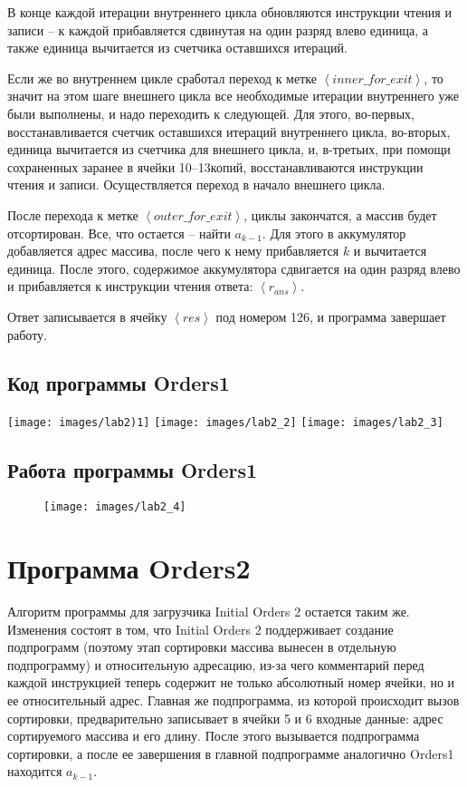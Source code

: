     В конце каждой итерации внутреннего цикла обновляются инструкции чтения и записи -- к каждой прибавляется сдвинутая на один разряд влево единица, а также единица вычитается из счетчика оставшихся итераций.

    Если же во внутреннем цикле сработал переход к метке $\left<inner\_for\_exit\right>$, то значит на этом шаге внешнего цикла все необходимые итерации внутреннего уже были выполнены, и надо переходить к следующей.
    Для этого, во-первых, восстанавливается счетчик оставшихся итераций внутреннего цикла, во-вторых, единица вычитается из счетчика для внешнего цикла, и, в-третьих, при помощи сохраненных заранее в ячейки 10--13копий, восстанавливаются инструкции чтения и записи.
    Осуществляется переход в начало внешнего цикла.

    После перехода к метке $\left<outer\_for\_exit\right>$, циклы закончатся, а массив будет отсортирован.
    Все, что остается -- найти $a_{k-1}$.
    Для этого в аккумулятор добавляется адрес массива, после чего к нему прибавляется $k$ и вычитается единица.
    После этого, содержимое аккумулятора сдвигается на один разряд влево и прибавляется к инструкции чтения ответа: $\left<r_{ans}\right>$.

    Ответ записывается в ячейку $\left<res\right>$ под номером 126, и программа завершает работу.

    \subsection{Код программы Orders1}
    \begin{flushleft}
        \texttt{[image: images/lab2)1]}
        \newpage
        \texttt{[image: images/lab2\_2]}
        \texttt{[image: images/lab2\_3]}
    \end{flushleft}
    \subsection{Работа программы Orders1}
    \begin{figure}[H]
        \centering
        \texttt{[image: images/lab2\_4]}
        \label{fig:res_1}
    \end{figure}

    \section{Программа Orders2}
    Алгоритм программы для загрузчика Initial Orders 2 остается таким же.
    Изменения состоят в том, что Initial Orders 2 поддерживает создание подпрограмм (поэтому этап сортировки массива вынесен в отдельную подпрограмму) и относительную адресацию, из-за чего комментарий перед каждой инструкцией теперь содержит не только абсолютный номер ячейки, но и ее относительный адрес.
    Главная же подпрограмма, из которой происходит вызов сортировки, предварительно записывает в ячейки 5 и 6 входные данные: адрес сортируемого массива и его длину.
    После этого вызывается подпрограмма сортировки, а после ее завершения в главной подпрограмме аналогично Orders1 находится $a_{k-1}$.

